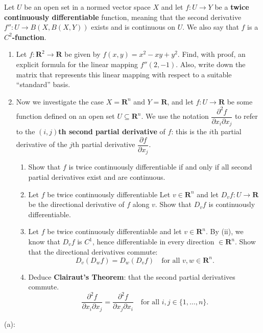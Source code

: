 \documentclass{article}
\newcommand{\R}{\mathbf{R}}
\theoremstyle{plain} %
\numberwithin{thm}{section} %
\theoremstyle{definition}
\begin{document}
    \newpage
    \begin{question}{28}
        Let $U$ be an open set in a normed vector space $X$ and let $f:U\rightarrow Y$ be a \textbf{twice continuously differentiable} function, meaning that the second derivative $f'':U\rightarrow B(X,B(X,Y))$ exists and is continuous on $U$. We also say that $f$ is a \textbf{$C^2$-function}.
        \begin{enumerate}[label=(\alph*)]
            \item Let $f:\R^2\rightarrow \R$ be given by $f(x,y)=x^2-xy+y^2$. Find, with proof, an explicit formula for the linear mapping $f''(2,-1)$. Also, write down the matrix that represents this linear mapping with respect to a suitable ``standard'' basis.
            
            \item Now we investigate the case $X=\R^n$ and $Y=\R$, and let $f:U\rightarrow \R$ be some function defined on an open set $U\subseteq \R^n$. We use the notation $\dfrac{\partial^2 f}{\partial x_i\partial x_j}$ to refer to the \textbf{$(i,j)$th second partial derivative} of $f$: this is the $i$th partial derivative of the $j$th partial derivative $\dfrac{\partial f}{\partial x_j}$.
    

            \begin{enumerate}[label=(\roman*)]
                \item Show that $f$ is twice continuously differentiable if and only if all second partial derivatives exist and are continuous.

                \item Let $f$ be twice continuously differentiable Let $v\in \R^n$ and let $D_vf:U\rightarrow \R$ be the directional derivative of $f$ along $v$. Show that $D_vf$ is continuously differentiable.

                \item Let $f$ be twice continuously differentiable and let $v\in \R^n$. By (ii), we know that $D_vf$ is $C^1$, hence differentiable in every direction $\in \R^n$. Show that the directional derivatives commute:
                    \[ D_v(D_wf) = D_w(D_vf) \quad \text{for all $v,w\in \R^n$.} \]
                \item Deduce \textbf{Clairaut's Theorem}: that the second partial derivatives commute.
                \[ \dfrac{\partial^2 f}{\partial x_i\partial x_j} = \dfrac{\partial^2 f}{\partial x_j\partial x_i} \quad \text{for all $i,j\in \{1,\ldots,n\}$.} \]
            \end{enumerate}
        \end{enumerate}
        \tcblower
        (a):


\end{question}
\end{document}
